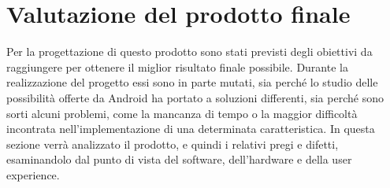 \section{Valutazione del prodotto finale}
\label{valutazione}
Per la progettazione di questo prodotto sono stati previsti degli obiettivi da raggiungere per ottenere il miglior risultato finale possibile. Durante la realizzazione del progetto essi sono in parte mutati, sia perché lo studio delle possibilità offerte da Android ha portato a soluzioni differenti, sia perché sono sorti alcuni problemi, come la mancanza di tempo o la maggior difficoltà incontrata nell'implementazione di una determinata caratteristica. In questa sezione verrà analizzato il prodotto, e quindi i relativi pregi e difetti, esaminandolo dal punto di vista del software, dell'hardware e della user experience.
